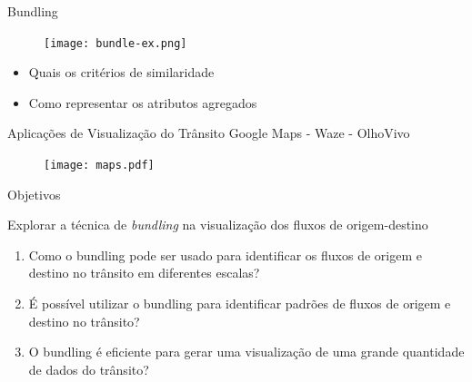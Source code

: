 {
\begin{frame}{Bundling}
  \begin{figure}[!htb]
    \centering
    \texttt{[image: bundle-ex.png]}
  \end{figure}

  \pause
  \begin{itemize}
    \item Quais os critérios de similaridade 
    \item Como representar os atributos agregados
  \end{itemize}
\end{frame}
}


\begin{frame}{Aplicações de Visualização do Trânsito}
  \centering
  Google Maps - Waze - OlhoVivo
  \begin{figure}[!htb]
    \centering
    \texttt{[image: maps.pdf]}
  \end{figure}
 \end{frame}

\begin{frame}{Objetivos}
  \begin{block}{Explorar a técnica de \emph{bundling} na visualização dos fluxos de origem-destino}
    \begin{enumerate}
      \pause
      \item Como o bundling pode ser usado para identificar os fluxos de origem
      e destino no trânsito em diferentes escalas?

      \pause
      \item É possível utilizar o bundling para identificar padrões de fluxos
      de origem e destino no trânsito?

      \pause
      \item O bundling é eficiente para gerar uma visualização de uma grande
      quantidade de dados do trânsito?
    \end{enumerate}
  \end{block}
\end{frame}

